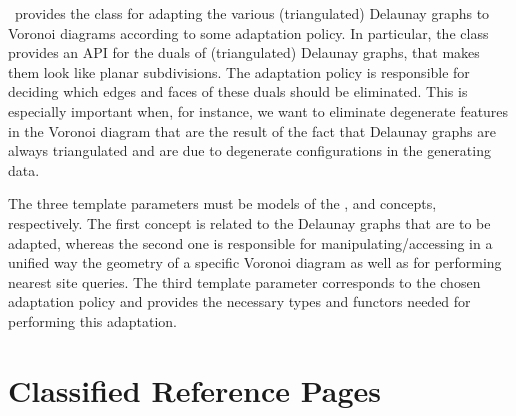 



\cgal\ provides the class  for
adapting the various (triangulated) Delaunay graphs to Voronoi
diagrams according to some adaptation policy.
In particular, the class 
provides an API for the duals of (triangulated) Delaunay graphs, that
makes them look like planar subdivisions. The adaptation policy is
responsible for deciding which edges and faces of these duals should
be eliminated. This is especially important when, for instance, we
want to eliminate degenerate features in the Voronoi diagram that are
the result of the fact that Delaunay graphs are always triangulated
and are due to degenerate configurations in the generating data.

The three template parameters must be models of the
,  and
 concepts, respectively.
The first concept is related to the Delaunay graphs that are to be
adapted, whereas the second one is responsible for
manipulating/accessing in a unified way the geometry of a specific
Voronoi diagram as well as for performing nearest site queries. 
The third template parameter corresponds to the chosen adaptation
policy and provides the necessary types and functors needed for
performing this adaptation.

\section{Classified Reference Pages}

\\
\\

